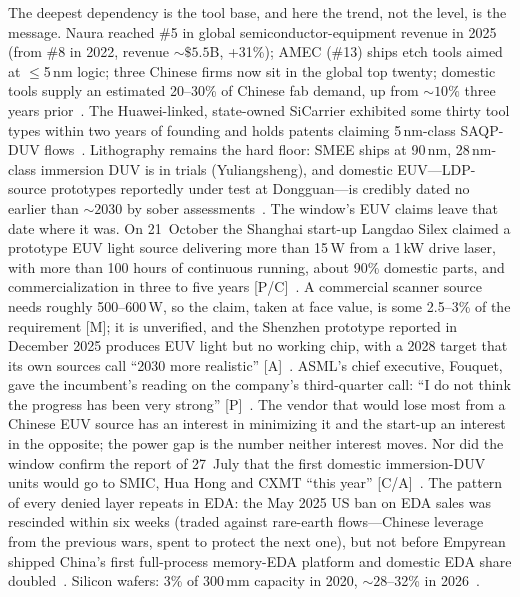 The deepest dependency is the tool base, and here the trend, not the level, is the message. Naura reached \#5 in global semiconductor-equipment revenue in 2025 (from \#8 in 2022, revenue ${\sim}\$5.5$B, +31\%); AMEC (\#13) ships etch tools aimed at $\leq$5\,nm logic; three Chinese firms now sit in the global top twenty; domestic tools supply an estimated 20--30\% of Chinese fab demand, up from ${\sim}10\%$ three years prior~\cite{toolmakers-top20,naura}. The Huawei-linked, state-owned SiCarrier exhibited some thirty tool types within two years of founding and holds patents claiming 5\,nm-class SAQP-DUV flows~\cite{sicarrier}. Lithography remains the hard floor: SMEE ships at 90\,nm, 28\,nm-class immersion DUV is in trials (Yuliangsheng), and domestic EUV---LDP-source prototypes reportedly under test at Dongguan---is credibly dated no earlier than ${\sim}2030$ by sober assessments~\cite{litho}. The window's EUV claims leave that date where it was. On 21~October the Shanghai start-up Langdao Silex claimed a prototype EUV light source delivering more than 15\,W from a 1\,kW drive laser, with more than 100 hours of continuous running, about 90\% domestic parts, and commercialization in three to five years [P/C]~\cite{hw-langdao-euv}. A commercial scanner source needs roughly 500--600\,W, so the claim, taken at face value, is some 2.5--3\% of the requirement [M]; it is unverified, and the Shenzhen prototype reported in December 2025 produces EUV light but no working chip, with a 2028 target that its own sources call ``2030 more realistic'' [A]~\cite{hw-langdao-euv}. ASML's chief executive, Fouquet, gave the incumbent's reading on the company's third-quarter call: ``I do not think the progress has been very strong'' [P]~\cite{hw-langdao-euv}. The vendor that would lose most from a Chinese EUV source has an interest in minimizing it and the start-up an interest in the opposite; the power gap is the number neither interest moves. Nor did the window confirm the report of 27~July that the first domestic immersion-DUV units would go to SMIC, Hua Hong and CXMT ``this year'' [C/A]~\cite{hw-langdao-euv}. The pattern of every denied layer repeats in EDA: the May 2025 US ban on EDA sales was rescinded within six weeks (traded against rare-earth flows---Chinese leverage from the previous wars, spent to protect the next one), but not before Empyrean shipped China's first full-process memory-EDA platform and domestic EDA share doubled~\cite{eda}. Silicon wafers: 3\% of 300\,mm capacity in 2020, ${\sim}28$--32\% in 2026~\cite{wafers}.


